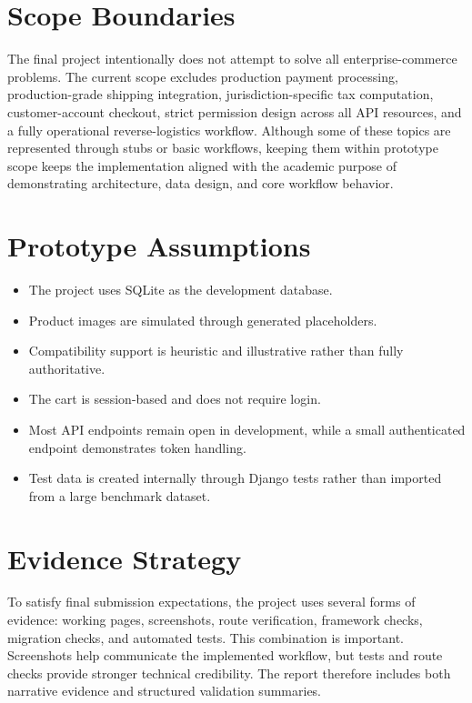 \documentclass[12pt,letterpaper,oneside,openany]{book}
\begin{document}
\section{Scope Boundaries}

\begin{justifying}
The final project intentionally does not attempt to solve all
enterprise-commerce problems. The current scope excludes production payment
processing, production-grade shipping integration, jurisdiction-specific tax
computation, customer-account checkout, strict permission design across all API
resources, and a fully operational reverse-logistics workflow. Although some of
these topics are represented through stubs or basic workflows, keeping them
within prototype scope keeps the implementation aligned with the academic
purpose of demonstrating architecture, data design, and core workflow
behavior.
\end{justifying}

\section{Prototype Assumptions}

\begin{itemize}[leftmargin=0.4in]
    \item The project uses SQLite as the development database.
    \item Product images are simulated through generated placeholders.
    \item Compatibility support is heuristic and illustrative rather than fully authoritative.
    \item The cart is session-based and does not require login.
    \item Most API endpoints remain open in development, while a small authenticated endpoint demonstrates token handling.
    \item Test data is created internally through Django tests rather than imported from a large benchmark dataset.
\end{itemize}

\section{Evidence Strategy}

\begin{justifying}
To satisfy final submission expectations, the project uses several forms of
evidence: working pages, screenshots, route verification, framework checks,
migration checks, and automated tests. This combination is important.
Screenshots help communicate the implemented workflow, but tests and route
checks provide stronger technical credibility. The report therefore includes
both narrative evidence and structured validation summaries.
\end{justifying}
\end{document}
